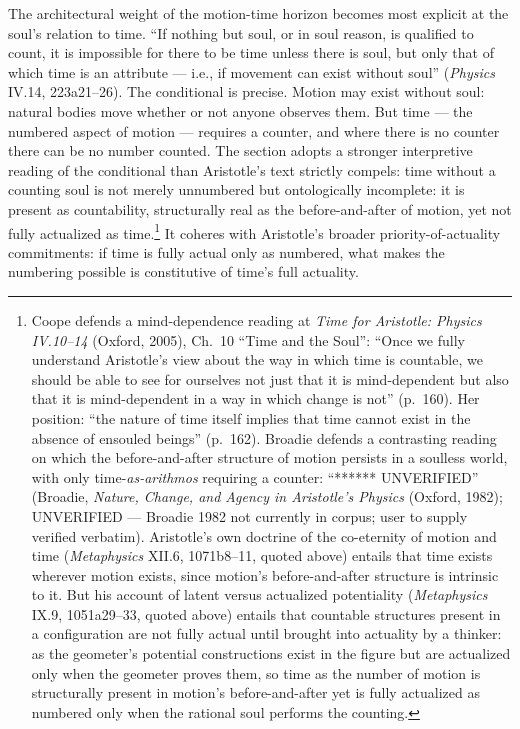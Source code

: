 \documentclass{article}
\begin{document}
The architectural weight of the motion-time horizon becomes most explicit at the soul's relation to time. ``If nothing but soul, or in soul reason, is qualified to count, it is impossible for there to be time unless there is soul, but only that of which time is an attribute --- i.e., if movement can exist without soul'' (\textit{Physics} IV.14, 223a21--26). The conditional is precise. Motion may exist without soul: natural bodies move whether or not anyone observes them. But time --- the numbered aspect of motion --- requires a counter, and where there is no counter there can be no number counted. The section adopts a stronger interpretive reading of the conditional than Aristotle's text strictly compels: time without a counting soul is not merely unnumbered but ontologically incomplete: it is present as countability, structurally real as the before-and-after of motion, yet not fully actualized as time.\footnote{Coope defends a mind-dependence reading at \textit{Time for Aristotle: Physics IV.10--14} (Oxford, 2005), Ch.~10 ``Time and the Soul'': ``Once we fully understand Aristotle's view about the way in which time is countable, we should be able to see for ourselves not just that it is mind-dependent but also that it is mind-dependent in a way in which change is not'' (p.~160). Her position: ``the nature of time itself implies that time cannot exist in the absence of ensouled beings'' (p.~162). Broadie defends a contrasting reading on which the before-and-after structure of motion persists in a soulless world, with only time-\textit{as-arithmos} requiring a counter: ``****** UNVERIFIED'' (Broadie, \textit{Nature, Change, and Agency in Aristotle's Physics} (Oxford, 1982); UNVERIFIED --- Broadie 1982 not currently in corpus; user to supply verified verbatim). Aristotle's own doctrine of the co-eternity of motion and time (\textit{Metaphysics} XII.6, 1071b8--11, quoted above) entails that time exists wherever motion exists, since motion's before-and-after structure is intrinsic to it. But his account of latent versus actualized potentiality (\textit{Metaphysics} IX.9, 1051a29--33, quoted above) entails that countable structures present in a configuration are not fully actual until brought into actuality by a thinker: as the geometer's potential constructions exist in the figure but are actualized only when the geometer proves them, so time as the number of motion is structurally present in motion's before-and-after yet is fully actualized as numbered only when the rational soul performs the counting.} It coheres with Aristotle's broader priority-of-actuality commitments: if time is fully actual only as numbered, what makes the numbering possible is constitutive of time's full actuality.
\end{document}
